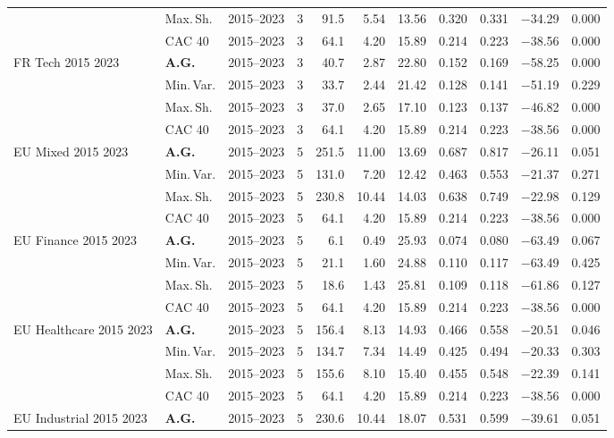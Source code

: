 \begin{longtable}{p{2.6cm} l c c r r r r r r r}
 & Max.\,Sh. & 2015--2023 & 3 & 91.5 & 5.54 & 13.56 & 0.320 & 0.331 & $-$34.29 & 0.000 \\
 & CAC 40 & 2015--2023 & 3 & 64.1 & 4.20 & 15.89 & 0.214 & 0.223 & $-$38.56 & 0.000 \\
\midrule
FR Tech 2015 2023 & \textbf{A.G.} & 2015--2023 & 3 & 40.7 & 2.87 & 22.80 & 0.152 & 0.169 & $-$58.25 & 0.000 \\
 & Min.\,Var. & 2015--2023 & 3 & 33.7 & 2.44 & 21.42 & 0.128 & 0.141 & $-$51.19 & 0.229 \\
 & Max.\,Sh. & 2015--2023 & 3 & 37.0 & 2.65 & 17.10 & 0.123 & 0.137 & $-$46.82 & 0.000 \\
 & CAC 40 & 2015--2023 & 3 & 64.1 & 4.20 & 15.89 & 0.214 & 0.223 & $-$38.56 & 0.000 \\
\midrule
EU Mixed 2015 2023 & \textbf{A.G.} & 2015--2023 & 5 & 251.5 & 11.00 & 13.69 & 0.687 & 0.817 & $-$26.11 & 0.051 \\
 & Min.\,Var. & 2015--2023 & 5 & 131.0 & 7.20 & 12.42 & 0.463 & 0.553 & $-$21.37 & 0.271 \\
 & Max.\,Sh. & 2015--2023 & 5 & 230.8 & 10.44 & 14.03 & 0.638 & 0.749 & $-$22.98 & 0.129 \\
 & CAC 40 & 2015--2023 & 5 & 64.1 & 4.20 & 15.89 & 0.214 & 0.223 & $-$38.56 & 0.000 \\
\midrule
EU Finance 2015 2023 & \textbf{A.G.} & 2015--2023 & 5 & 6.1 & 0.49 & 25.93 & 0.074 & 0.080 & $-$63.49 & 0.067 \\
 & Min.\,Var. & 2015--2023 & 5 & 21.1 & 1.60 & 24.88 & 0.110 & 0.117 & $-$63.49 & 0.425 \\
 & Max.\,Sh. & 2015--2023 & 5 & 18.6 & 1.43 & 25.81 & 0.109 & 0.118 & $-$61.86 & 0.127 \\
 & CAC 40 & 2015--2023 & 5 & 64.1 & 4.20 & 15.89 & 0.214 & 0.223 & $-$38.56 & 0.000 \\
\midrule
EU Healthcare 2015 2023 & \textbf{A.G.} & 2015--2023 & 5 & 156.4 & 8.13 & 14.93 & 0.466 & 0.558 & $-$20.51 & 0.046 \\
 & Min.\,Var. & 2015--2023 & 5 & 134.7 & 7.34 & 14.49 & 0.425 & 0.494 & $-$20.33 & 0.303 \\
 & Max.\,Sh. & 2015--2023 & 5 & 155.6 & 8.10 & 15.40 & 0.455 & 0.548 & $-$22.39 & 0.141 \\
 & CAC 40 & 2015--2023 & 5 & 64.1 & 4.20 & 15.89 & 0.214 & 0.223 & $-$38.56 & 0.000 \\
\midrule
EU Industrial 2015 2023 & \textbf{A.G.} & 2015--2023 & 5 & 230.6 & 10.44 & 18.07 & 0.531 & 0.599 & $-$39.61 & 0.051 \\

\end{longtable}
